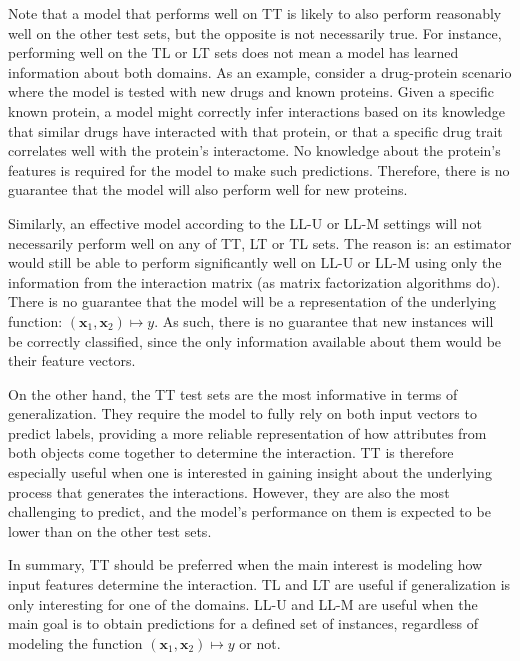 Note that a model that performs well on TT is likely to also perform reasonably well on the other test sets, but the opposite is not necessarily true.
%
For instance, performing well on the TL or LT sets does not mean a model has learned information about both domains. As an example, consider a drug-protein scenario where the model is tested with new drugs and known proteins. Given a specific known protein, a model might correctly infer interactions based on its knowledge that similar drugs have interacted with that protein, or that a specific drug trait correlates well with the protein's interactome. No knowledge about the protein's features is required for the model to make such predictions.
Therefore, there is no guarantee that the model will also perform well for new proteins.

Similarly, an effective model according to the LL-U or LL-M settings will not necessarily perform well on any of TT, LT or TL sets. The reason is: an estimator would still be able to perform significantly well on LL-U or LL-M using only the information from the interaction matrix (as matrix factorization algorithms do). There is no guarantee that the model will be a representation of the underlying function: $(\mathbf{x}_1, \mathbf{x}_2) \mapsto y$. As such, there is no guarantee that new instances will be correctly classified, since the only information available about them would be their feature vectors.

On the other hand, the TT test sets are the most informative in terms of generalization. They require the model to fully rely on both input vectors to predict labels, providing a more reliable representation of how attributes from both objects come together to determine the interaction.
TT is therefore especially useful when one is interested in gaining insight about the underlying process that generates the interactions. However, they are also the most challenging to predict, and the model's performance on them is expected to be lower than on the other test sets.

In summary, TT should be preferred when the main interest is modeling how input features determine the interaction. TL and LT are useful if generalization is only interesting for one of the domains. LL-U and LL-M are useful when the main goal is to obtain predictions for a defined set of instances, regardless of modeling the function $(\mathbf{x}_1, \mathbf{x}_2) \mapsto y$ or not.

